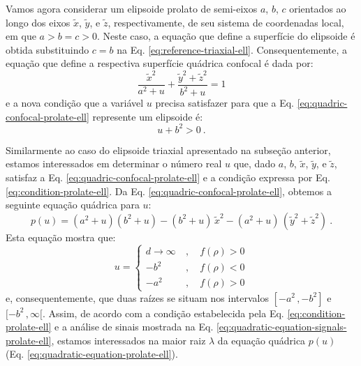Vamos agora considerar um elipsoide prolato de semi-eixos $a$, $b$, 
$c$ orientados ao longo dos eixos $\tilde{x}$, $\tilde{y}$, e 
$\tilde{z}$, respectivamente, de seu sistema de coordenadas local, em que $a > b = c > 0$.
Neste caso, a equação que define a superfície do elipsoide é obtida substituindo
$c = b$ na Eq. \ref{eq:reference-triaxial-ell}. Consequentemente, a equação que define a
respectiva superfície quádrica confocal é dada por:
\begin{equation}
\frac{\tilde{x}^{2}}{a^{2} + u} + \frac{\tilde{y}^{2} + \tilde{z}^{2}}{b^{2} + u} = 1
\label{eq:quadric-confocal-prolate-ell}
\end{equation}
e a nova condição que a variável $u$ precisa satisfazer para que a
Eq. \ref{eq:quadric-confocal-prolate-ell} represente um elipsoide é:
\begin{equation}
u + b^{2} > 0 \: .
\label{eq:condition-prolate-ell}
\end{equation}

Similarmente ao caso do elipsoide triaxial apresentado na subseção anterior,
estamos interessados em determinar o número real $u$ que, dado $a$, $b$, $\tilde{x}$, $\tilde{y}$,
e $\tilde{z}$, satisfaz a Eq. \ref{eq:quadric-confocal-prolate-ell} e a condição expressa por
Eq. \ref{eq:condition-prolate-ell}. Da Eq. \ref{eq:quadric-confocal-prolate-ell}, obtemos a
seguinte equação quádrica para $u$:
\begin{equation}
p(u) = (a^{2} + u)(b^{2} + u) - (b^{2} + u) \, \tilde{x}^{2}
- (a^{2} + u) \, (\tilde{y}^{2} + \tilde{z}^{2}) \: .
\label{eq:quadratic-equation-prolate-ell}
\end{equation}
Esta equação mostra que:
\begin{equation}
u = \begin{cases}
d \to \infty \: &, \quad f(\rho) > 0 \\
-b^{2} \: &, \quad f(\rho) < 0 \\
-a^{2} \: &, \quad f(\rho) > 0
\end{cases}
\label{eq:quadratic-equation-signals-prolate-ell}
\end{equation}
e, consequentemente, que duas raízes se situam nos intervalos $[ -a^{2} \, , -b^{2} ]$ 
e $[ -b^{2} \, , \infty [$. Assim, de acordo com a condição estabelecida pela
Eq. \ref{eq:condition-prolate-ell} e a análise de sinais mostrada na Eq. \ref{eq:quadratic-equation-signals-prolate-ell},
estamos interessados na maior raiz $\lambda$ da equação quádrica $p(u)$ (Eq. \ref{eq:quadratic-equation-prolate-ell}).

